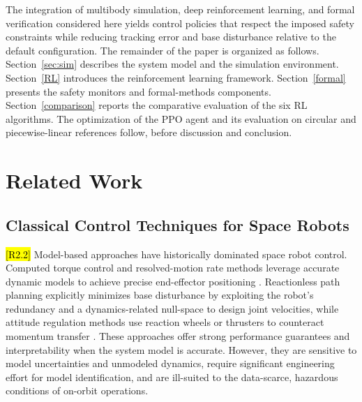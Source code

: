 \documentclass{ieeeaccess}
\newcommand{\hltwo}[1]{{\sethlcolor{rtwo}\hl{#1}}}
\newenvironment{rtwohl}
  {\def\FrameCommand{\colorbox{rtwo}}\MakeFramed{\advance\hsize-\width\FrameRestore}}
  {\endMakeFramed}
\begin{document}
The integration of multibody simulation, deep reinforcement learning, and formal verification considered here yields control policies that respect the imposed safety constraints while reducing tracking error and base disturbance relative to the default configuration. The remainder of the paper is organized as follows. Section~\ref{sec:sim} describes the system model and the simulation environment. Section~\ref{RL} introduces the reinforcement learning framework. Section~\ref{formal} presents the safety monitors and formal-methods components. Section~\ref{comparison} reports the comparative evaluation of the six RL algorithms. The optimization of the PPO agent and its evaluation on circular and piecewise-linear references follow, before discussion and conclusion.

\section{Related Work}

\subsection{Classical Control Techniques for Space Robots}
\begin{rtwohl}
\hltwo{[R2.2]} Model-based approaches have historically dominated space robot control. Computed torque control and resolved-motion rate methods leverage accurate dynamic models to achieve precise end-effector positioning \cite{b1}. Reactionless path planning explicitly
minimizes base disturbance by exploiting the robot's redundancy and a dynamics-related null-space to design joint velocities, while attitude regulation methods use reaction wheels or thrusters
to counteract momentum transfer \cite{b6,kaigom2011optimal}. These approaches offer strong performance guarantees and
interpretability when the system model is accurate. However, they are sensitive to model uncertainties and unmodeled
dynamics, require significant engineering effort for model identification, and are ill-suited to the data-scarce,
hazardous conditions of on-orbit operations.
\end{rtwohl}
\end{document}
